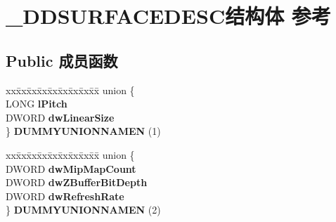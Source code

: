 \hypertarget{struct___d_d_s_u_r_f_a_c_e_d_e_s_c}{}\section{\+\_\+\+D\+D\+S\+U\+R\+F\+A\+C\+E\+D\+E\+S\+C结构体 参考}
\label{struct___d_d_s_u_r_f_a_c_e_d_e_s_c}
\subsection*{Public 成员函数}
\begin{DoxyCompactItemize}
\item 
\mbox{\label{struct___d_d_s_u_r_f_a_c_e_d_e_s_c_a38d691d3c7c47436ff3b2e1ad5102e50}} 
\begin{tabbing}
xx\=xx\=xx\=xx\=xx\=xx\=xx\=xx\=xx\=\kill
union \{\\
\>LONG {\bfseries lPitch}\\
\>DWORD {\bfseries dwLinearSize}\\
\} {\bfseries DUMMYUNIONNAMEN} (1)\\

\end{tabbing}\item 
\mbox{\label{struct___d_d_s_u_r_f_a_c_e_d_e_s_c_a2434ca38105c5623c96e7526a69f1abc}} 
\begin{tabbing}
xx\=xx\=xx\=xx\=xx\=xx\=xx\=xx\=xx\=\kill
union \{\\
\>DWORD {\bfseries dwMipMapCount}\\
\>DWORD {\bfseries dwZBufferBitDepth}\\
\>DWORD {\bfseries dwRefreshRate}\\
\} {\bfseries DUMMYUNIONNAMEN} (2)\\

\end{tabbing}\end{DoxyCompactItemize}
